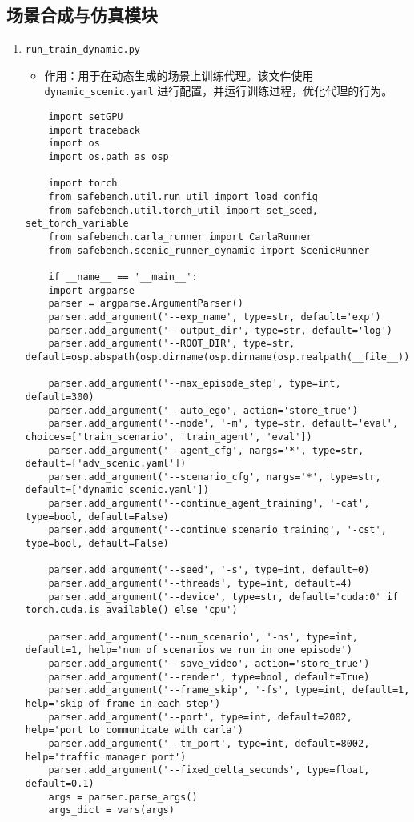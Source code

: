 \subsection*{场景合成与仿真模块}
\begin{enumerate}
	\item \texttt{run\_train\_dynamic.py}
	\begin{itemize}
		\item 作用：用于在动态生成的场景上训练代理。该文件使用 \texttt{dynamic\_scenic.yaml} 进行配置，并运行训练过程，优化代理的行为。
	\end{itemize}
	\begin{verbatim}
	import setGPU
	import traceback
	import os
	import os.path as osp
	
	import torch 
	from safebench.util.run_util import load_config
	from safebench.util.torch_util import set_seed, set_torch_variable
	from safebench.carla_runner import CarlaRunner
	from safebench.scenic_runner_dynamic import ScenicRunner
	
	if __name__ == '__main__':
	import argparse
	parser = argparse.ArgumentParser()
	parser.add_argument('--exp_name', type=str, default='exp')
	parser.add_argument('--output_dir', type=str, default='log')
	parser.add_argument('--ROOT_DIR', type=str, default=osp.abspath(osp.dirname(osp.dirname(osp.realpath(__file__)))))
	
	parser.add_argument('--max_episode_step', type=int, default=300)
	parser.add_argument('--auto_ego', action='store_true')
	parser.add_argument('--mode', '-m', type=str, default='eval', choices=['train_scenario', 'train_agent', 'eval'])
	parser.add_argument('--agent_cfg', nargs='*', type=str, default=['adv_scenic.yaml'])
	parser.add_argument('--scenario_cfg', nargs='*', type=str, default=['dynamic_scenic.yaml'])
	parser.add_argument('--continue_agent_training', '-cat', type=bool, default=False)
	parser.add_argument('--continue_scenario_training', '-cst', type=bool, default=False)
	
	parser.add_argument('--seed', '-s', type=int, default=0)
	parser.add_argument('--threads', type=int, default=4)
	parser.add_argument('--device', type=str, default='cuda:0' if torch.cuda.is_available() else 'cpu')   
	
	parser.add_argument('--num_scenario', '-ns', type=int, default=1, help='num of scenarios we run in one episode')
	parser.add_argument('--save_video', action='store_true')
	parser.add_argument('--render', type=bool, default=True)
	parser.add_argument('--frame_skip', '-fs', type=int, default=1, help='skip of frame in each step')
	parser.add_argument('--port', type=int, default=2002, help='port to communicate with carla')
	parser.add_argument('--tm_port', type=int, default=8002, help='traffic manager port')
	parser.add_argument('--fixed_delta_seconds', type=float, default=0.1)
	args = parser.parse_args()
	args_dict = vars(args)
	

\end{verbatim}
\end{enumerate}
